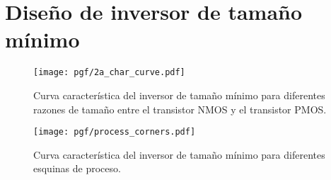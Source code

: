 \section{Diseño de inversor de tamaño mínimo}

\begin{figure}[!h]
	\centering
	\texttt{[image: pgf/2a\_char\_curve.pdf]}
	\caption{Curva característica del inversor de tamaño mínimo para diferentes razones de tamaño entre el transistor NMOS y el transistor PMOS.}
\end{figure}

\begin{figure}[!h]
	\centering
	\texttt{[image: pgf/process\_corners.pdf]}
	\caption{Curva característica del inversor de tamaño mínimo para diferentes esquinas de proceso.}
\end{figure}
